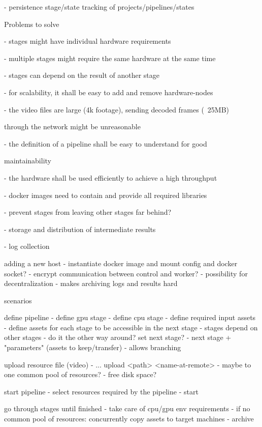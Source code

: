 - persistence stage/state tracking of projects/pipelines/states

Problems to solve



- stages might have individual hardware requirements

- multiple stages might require the same hardware at the same time

- stages can depend on the result of another stage

- for scalability, it shall be easy to add and remove hardware-nodes

- the video files are large (4k footage), sending decoded frames (~25MB)

through the network might be unreasonable

- the definition of a pipeline shall be easy to understand for good

maintainability

- the hardware shall be used efficiently to achieve a high throughput

- docker images need to contain and provide all required libraries

- prevent stages from leaving other stages far behind?

- storage and distribution of intermediate results

- log collection




adding a new host
- instantiate docker image and mount config and docker socket?
- encrypt communication between control and worker?
- possibility for decentralization
- makes archiving logs and results hard


scenarios

define pipeline
- define gpu stage
- define cpu stage
- define required input assets
- define assets for each stage to be accessible in the next stage
- stages depend on other stages
- do it the other way around? set next stage?
- next stage + "parameters" (assets to keep/transfer)
- allows branching

upload resource file (video)
- ... upload <path> <name-at-remote>
- maybe to one common pool of resources?
- free disk space?

start pipeline
- select resources required by the pipeline
- start

go through stages until finished
- take care of cpu/gpu env requirements
- if no common pool of resources: concurrently copy assets to target machines
- archive 

